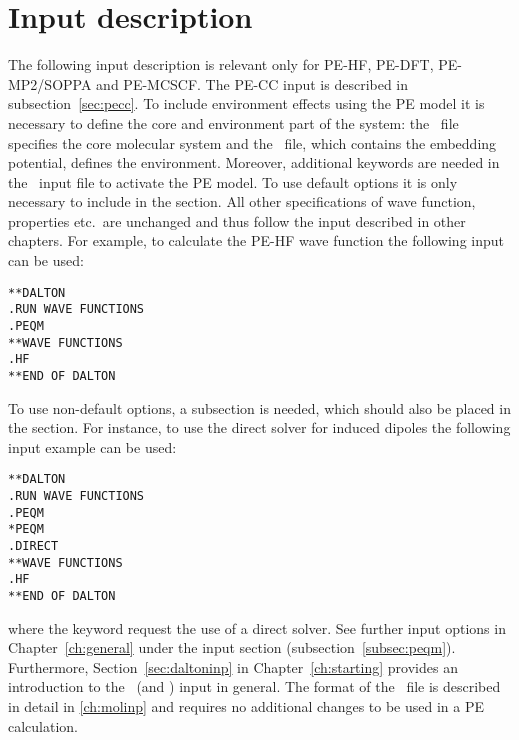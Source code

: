 \section{Input description}
The following input description is relevant only for PE-HF, PE-DFT,
PE-MP2/SOPPA and PE-MCSCF. The PE-CC input is described in
subsection~\ref{sec:pecc}. To include environment effects using the PE model it
is necessary to define the core and environment part of the system: the \molinp\
file specifies the core molecular system and the \potinp\ file, which contains
the embedding potential, defines the environment. Moreover, additional
keywords are needed in the \dalinp\ input file to activate the PE model. To use
default options it is only necessary to include \Key{PEQM} in the \Sec{*DALTON}
section. All other specifications of wave function, properties etc.\ are
unchanged and thus follow the input described in other chapters. For example, to
calculate the PE-HF wave function the following input can be used:
\begin{verbatim}
**DALTON
.RUN WAVE FUNCTIONS
.PEQM
**WAVE FUNCTIONS
.HF
**END OF DALTON
\end{verbatim}
To use non-default options, a  subsection is needed, which should also be placed in the
\Sec{*DALTON} section. For instance, to use the direct solver for induced
dipoles the following input example can be used:
\begin{verbatim}
**DALTON
.RUN WAVE FUNCTIONS
.PEQM
*PEQM
.DIRECT
**WAVE FUNCTIONS
.HF
**END OF DALTON
\end{verbatim}
where the  keyword request the use of a direct solver. See further
input options in Chapter~\ref{ch:general} under the \Sec{PEQM}
input section (subsection~\ref{subsec:peqm}). Furthermore,
Section~\ref{sec:daltoninp} in Chapter~\ref{ch:starting} provides an
introduction to the \dalton\ (and \molinp) input in general. The format of the
\molinp\ file is described in detail in \ref{ch:molinp} and requires no
additional changes to be used in a PE calculation.

